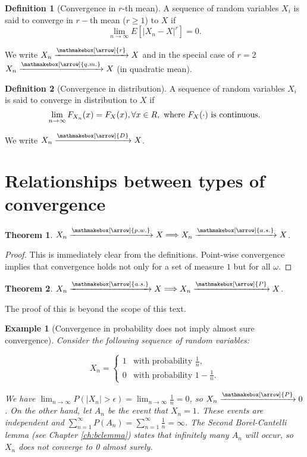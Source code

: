 \documentclass{book}
\theoremstyle{plain}%
\newtheorem{prototheorem}{Example}[section]
\newenvironment{cexample}
   {\colorlet{shadecolor}{gray!10}\begin{shaded}\begin{prototheorem}}
   {\end{prototheorem}\end{shaded}}
\newtheorem{theorem}{Theorem}[section]
\theoremstyle{definition}
\newtheorem{definition}{Definition}[section]
\newlength{\arrow}
\newcommand*{\myrightarrow}[1]{\xrightarrow{\mathmakebox[\arrow]{#1}}}
\begin{document}
\begin{definition}[Convergence in $r$-th mean]
A sequence of random variables ${X_i}$ is said to converge in $r-$th mean ($r \geq 1$) to $X$ if $$\lim_{n \rightarrow \infty} E[|X_n - X|^r] = 0.$$

We write $X_n \myrightarrow{r} X$ and in the special case of $r = 2$  $X_n \myrightarrow{q.m.} X$ (in quadratic mean).
\end{definition}

\begin{definition}[Convergence in distribution]
A sequence of random variables ${X_i}$ is said to converge in distribution to $X$ if $$\lim_{n \rightarrow \infty} F_{X_n}(x) = F_X(x), \forall x \in R, \text{ where \mbox{$F_X(\cdot)$} is continuous.}$$

We write $X_n \myrightarrow{D} X$.
\end{definition}

\section{Relationships between types of convergence}

\begin{theorem}
$X_n \myrightarrow{p.w.} X \Longrightarrow X_n \myrightarrow{a.s.} X$.
\end{theorem}

\begin{proof}
This is immediately clear from the definitions. Point-wise convergence implies that convergence holds not only for a set of measure $1$ but for all $\omega$.
\end{proof}


\begin{theorem}
$X_n \myrightarrow{a.s.} X \Longrightarrow X_n \myrightarrow{P} X$.
\end{theorem}

The proof of this is beyond the scope of this text.

\begin{cexample}[Convergence in probability does not imply almost sure convergence]
Consider the following sequence of random variables:

$$
X_n =
\begin{cases}
1 & \text{with probability } \frac{1}{n},\\
0   & \text{with probability } 1-\frac{1}{n}.
\end{cases}
$$

We have $\lim_{n \rightarrow \infty} P(|X_n| > \epsilon) = \lim_{n \rightarrow \infty}\frac{1}{n} = 0$, so $X_n \myrightarrow{P} 0$. On the other hand, let $A_n$ be the event that $X_n = 1$. These events are independent and $\sum_{n=1}^\infty P(A_n) = \sum_{n=1}^\infty \frac{1}{n} = \infty$. The Second Borel-Cantelli lemma (see Chapter \ref{ch:bclemma}) states that infinitely many $A_n$ will occur, so $X_n$ does not converge to 0 almost surely.
\end{cexample}
\end{document}
